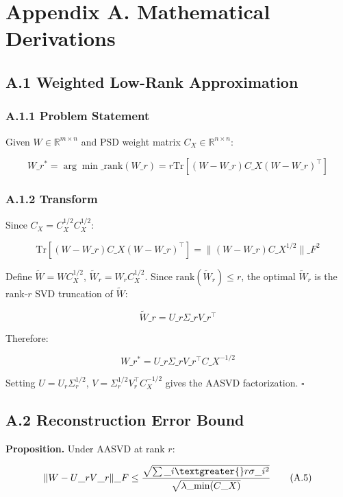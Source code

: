 
\section{Appendix A. Mathematical Derivations}

\subsection{A.1 Weighted Low-Rank Approximation}

\subsubsection{A.1.1 Problem Statement}

Given $W \in \mathbb{R}^{m \times n}$ and PSD weight matrix $C_X \in \mathbb{R}^{n \times n}$:

\[
W\_r^* = \arg\min\_{\text{rank}(W\_r) = r} \mathrm{Tr}\!\left[(W - W\_r) C\_X (W - W\_r)^\top\right]
\tag{A.1}
\]

\subsubsection{A.1.2 Transform}

Since $C_X = C_X^{1/2} C_X^{1/2}$:

\[
\mathrm{Tr}[(W - W\_r) C\_X (W - W\_r)^\top] = \|(W - W\_r) C\_X^{1/2}\|\_F^2
\tag{A.2}
\]

Define $\tilde{W} = W C_X^{1/2}$, $\tilde{W}_r = W_r C_X^{1/2}$. Since 
$\text{rank}(\tilde{W}_r) \leq r$, the optimal $\tilde{W}_r$ is the rank-$r$ 
SVD truncation of $\tilde{W}$:

\[
\tilde{W}\_r = U\_r \Sigma\_r V\_r^\top
\tag{A.3}
\]

Therefore:

\[
W\_r^* = U\_r \Sigma\_r V\_r^\top C\_X^{-1/2}
\tag{A.4}
\]

Setting $U = U_r \Sigma_r^{1/2}$, $V = \Sigma_r^{1/2} V_r^\top C_X^{-1/2}$ 
gives the AASVD factorization. $\square$

\subsection{A.2 Reconstruction Error Bound}

\textbf{Proposition.} Under AASVD at rank $r$:

\[
\|W - U\_r V\_r\|\_F \leq \frac{\sqrt{\sum\_{i \textgreater{} r} \sigma\_i^2}}{\sqrt{\lambda\_\text{min}(C\_X)}}
\tag{A.5}
\]

